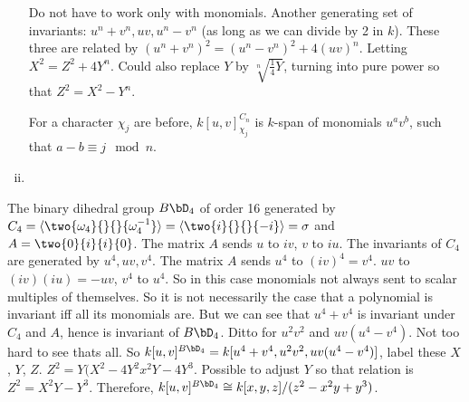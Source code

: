\begin{ex}
\begin{enumerate}[(i)]
Do not have to work only with monomials. Another generating set of invariants: $u^n+v^n, uv, u^n-v^n$ (as long as we can divide by 2 in $k$). These three are related by $(u^n+v^n)^2= (u^n-v^n)^2+ 4(uv)^n$. Letting $X^2=Z^2+4Y^n$. Could also replace $Y$ by $\sqrt[n]{\frac{1}{4}Y}$, turning into pure power so that $Z^2= X^2 - Y^n$. 

For a character $\chi_j$ are before, $k[u,v]^{C_n}_{\chi_j}$ is $k$-span of monomials $u^av^b$, such that $a-b \equiv j \mod n$. 



\item 
\end{enumerate}
\end{ex}













\begin{ex}
The binary dihedral group $B\bD_4$ of order 16 generated by $C_4= \langle \two{\omega_4}{}{}{\omega_4^{-1}} \rangle = \langle \two{i}{}{}{-i} \rangle=\sigma$ and $A= \two{0}{i}{i}{0}$. The matrix $A$ sends $u$ to $iv$, $v$ to $iu$. The invariants of $C_4$ are generated by $u^4,uv,v^4$. The matrix $A$ sends $u^4$ to $(iv)^4=v^4$. $uv$ to $(iv)(iu)= -uv$, $v^4$ to $u^4$. So in this case monomials not always sent to scalar multiples of themselves. So it is not necessarily the case that a polynomial is invariant iff all its monomials are. But we can see that $u^4+v^4$ is invariant under $C_4$ and $A$, hence is invariant of $B\bD_4$. Ditto for $u^2v^2$ and $uv(u^4-v^4)$. Not too hard to see thats all. So $k[u,v]^{B\bD_4}= k[u^4+v^4,u^2v^2,uv(u^4-v^4)]$, label these $X$, $Y$, $Z$. $Z^2=Y(X^2-4Y^2x^2Y-4Y^3$. Possible to adjust $Y$ so that relation is $Z^2=X^2Y-Y^3$. Therefore, $k[u,v]^{B\bD_4} \cong k[x,y,z]/(z^2-x^2y+y^3)$. 
\end{ex}


